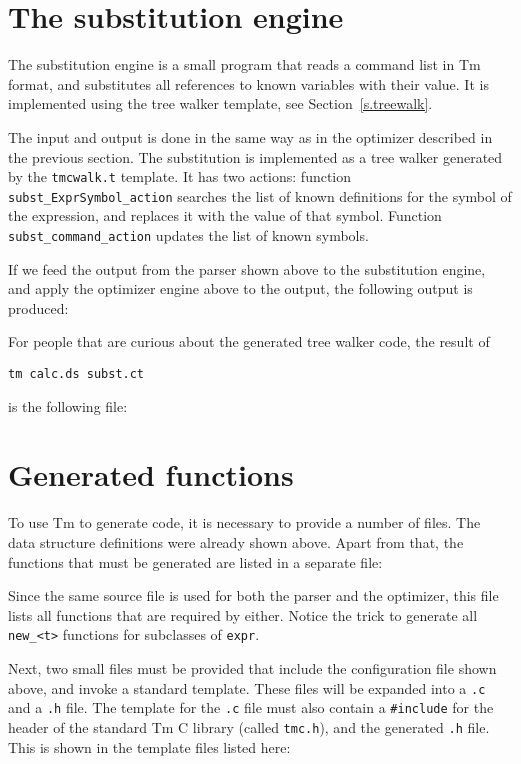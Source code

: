 \section{The substitution engine}
The substitution engine is a small program that reads a command list
in Tm format, and substitutes all references to known variables with
their value.
It is implemented using the tree walker template, see Section~\ref{s.treewalk}.
\begin{showfile}

\end{showfile}
The input and output is done in the same way as in the optimizer 
described in the previous section. The substitution is implemented as
a tree walker generated by the \verb'tmcwalk.t' template. It has
two actions: function \verb'subst_ExprSymbol_action' searches the list
of known definitions for the symbol of the expression, and replaces
it with the value of that symbol. Function \verb'subst_command_action'
updates the list of known symbols.
\par
If we feed the output from the parser shown above to the substitution
engine, and apply the optimizer engine above to the output, the following
output is produced:
\begin{showfile}
\end{showfile}
\par
For people that are curious about the generated tree walker code, the
result of
\begin{verbatim}
tm calc.ds subst.ct
\end{verbatim}
is the following file:
\begin{showfile}
\end{showfile}
\section{Generated functions}
To use Tm to generate code, it is necessary to provide a
number of files. The data structure definitions were already shown above.
Apart from that, the functions that must be generated are listed in a
separate file:
\begin{showfile}
\end{showfile}
Since the same source file is used for both the parser and the
optimizer, this file lists all functions that are required by either.
Notice the trick to generate all \verb'new_<t>' functions for subclasses
of \texttt{expr}.

Next, two small files must be provided that include the configuration
file shown above, and invoke a standard template. These files will be
expanded into a \verb'.c' and a \verb'.h' file. The template for the
\verb'.c' file must also contain a \verb'#include' for the header of the
standard Tm C library (called \verb'tmc.h'), and the generated \verb'.h'
file. This is shown in the template files listed here:

